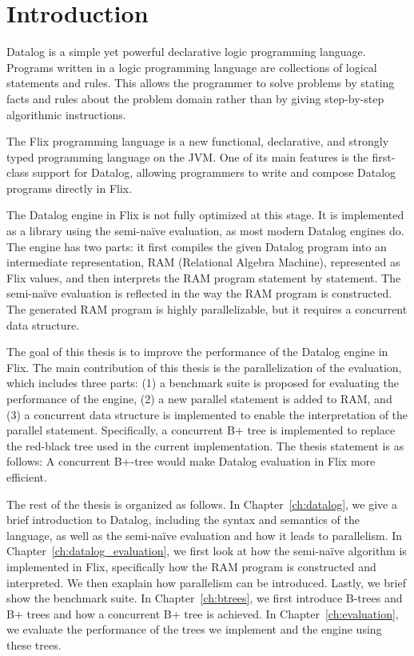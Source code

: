 \documentclass[11pt]{report}
\theoremstyle{definition}
\begin{document}
\chapter{Introduction}
\label{ch:intro}

Datalog is a simple yet powerful declarative logic programming language. Programs written in a logic programming language are collections of logical statements and rules. This allows the programmer to solve problems by stating facts and rules about the problem domain rather than by giving step-by-step algorithmic instructions.

The Flix programming language is a new functional, declarative, and strongly typed programming language on the JVM. One of its main features is the first-class support for Datalog, allowing programmers to write and compose Datalog programs directly in Flix.

The Datalog engine in Flix is not fully optimized at this stage. It is implemented as a library using the semi-na\"ive evaluation, as most modern Datalog engines do. The engine has two parts: it first compiles the given Datalog program into an intermediate representation, RAM (Relational Algebra Machine), represented as Flix values, and then interprets the RAM program statement by statement. The semi-na\"ive evaluation is reflected in the way the RAM program is constructed. The generated RAM program is highly parallelizable, but it requires a concurrent data structure.

The goal of this thesis is to improve the performance of the Datalog engine in Flix. The main contribution of this thesis is the parallelization of the evaluation, which includes three parts: (1) a benchmark suite is proposed for evaluating the performance of the engine, (2) a new parallel statement is added to RAM, and (3) a concurrent data structure is implemented to enable the interpretation of the parallel statement. Specifically, a concurrent B+ tree is implemented to replace the red-black tree used in the current implementation. The thesis statement is as follows: A concurrent B+-tree would make Datalog evaluation in Flix more efficient.

The rest of the thesis is organized as follows. In Chapter~\ref{ch:datalog}, we give a brief introduction to Datalog, including the syntax and semantics of the language, as well as the semi-naïve evaluation and how it leads to parallelism. In Chapter~\ref{ch:datalog_evaluation}, we first look at how the semi-naïve algorithm is implemented in Flix, specifically how the RAM program is constructed and interpreted. We then exaplain how parallelism can be introduced. Lastly, we brief show the benchmark suite. In Chapter~\ref{ch:btrees}, we first introduce B-trees and B+ trees and how a concurrent B+ tree is achieved. In Chapter~\ref{ch:evaluation}, we evaluate the performance of the trees we implement and the engine using these trees.
\end{document}

